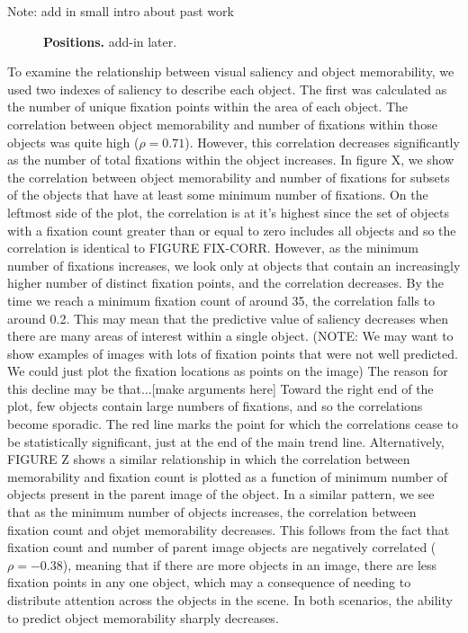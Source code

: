 Note: add in small intro about past work

\begin{figure}[t]
\centering
{}
\vspace{-5mm}\caption{\footnotesize\textbf{Positions.} add-in later. }\label{fig:exampleStimuli}
\end{figure}

To examine the relationship between visual saliency and object memorability, we used two indexes of saliency to describe each object. The first was calculated as the number of unique fixation points within the area of each object. The correlation between object memorability and number of fixations within those objects was quite high ($\rho = 0.71$). However, this correlation decreases significantly as the number of total fixations within the object increases. In figure X, we show the correlation between object memorability and number of fixations for subsets of the objects that have at least some minimum number of fixations. On the leftmost side of the plot, the correlation is at it's highest since the set of objects with a fixation count greater than or equal to zero includes all objects and so the correlation is identical to FIGURE FIX-CORR. However, as the minimum number of fixations increases, we look only at objects that contain an increasingly higher number of distinct fixation points, and the correlation decreases. By the time we reach a minimum fixation count of around 35, the correlation falls to around 0.2. This may mean that the predictive value of saliency decreases when there are many areas of interest within a single object. (NOTE: We may want to show examples of images with lots of fixation points that were not well predicted. We could just plot the fixation locations as points on the image) The reason for this decline may be that...[make arguments here] Toward the right end of the plot, few objects contain large numbers of fixations, and so the correlations become sporadic. The red line marks the point for which the correlations cease to be statistically significant, just at the end of the main trend line. Alternatively, FIGURE Z shows a similar relationship in which the correlation between memorability and fixation count is plotted as a function of minimum number of objects present in the parent image of the object. In a similar pattern, we see that as the minimum number of objects increases, the correlation between fixation count and objet memorability decreases. This follows from the fact that fixation count and number of parent image objects are negatively correlated ($\rho = -0.38$), meaning that if there are more objects in an image, there are less fixation points in any one object, which may a consequence of needing to distribute attention across the objects in the scene. In both scenarios, the ability to predict object memorability sharply decreases.
